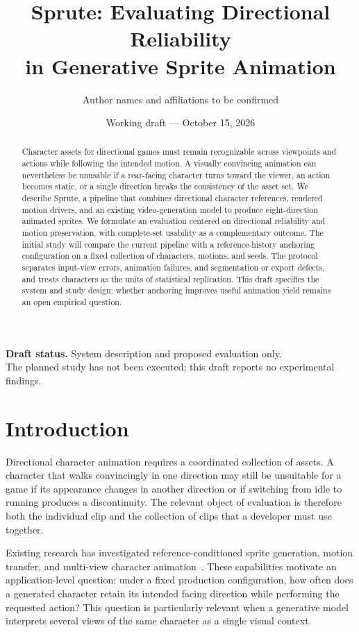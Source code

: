 \documentclass[11pt]{article}
\title{Sprute: Evaluating Directional Reliability\\in Generative Sprite Animation}
\author{Author names and affiliations to be confirmed}
\date{Working draft --- October 15, 2026}
\begin{document}
\maketitle
\begin{center}
\small\textbf{Draft status.} System description and proposed evaluation only.\\
The planned study has not been executed; this draft reports no experimental findings.
\end{center}

\begin{abstract}
Character assets for directional games must remain recognizable across viewpoints and actions while following the intended motion. A visually convincing animation can nevertheless be unusable if a rear-facing character turns toward the viewer, an action becomes static, or a single direction breaks the consistency of the asset set. We describe Sprute, a pipeline that combines directional character references, rendered motion drivers, and an existing video-generation model to produce eight-direction animated sprites. We formulate an evaluation centered on directional reliability and motion preservation, with complete-set usability as a complementary outcome. The initial study will compare the current pipeline with a reference-history anchoring configuration on a fixed collection of characters, motions, and seeds. The protocol separates input-view errors, animation failures, and segmentation or export defects, and treats characters as the units of statistical replication. This draft specifies the system and study design; whether anchoring improves useful animation yield remains an open empirical question.
\end{abstract}

\section{Introduction}
Directional character animation requires a coordinated collection of assets. A character that walks convincingly in one direction may still be unsuitable for a game if its appearance changes in another direction or if switching from idle to running produces a discontinuity. The relevant object of evaluation is therefore both the individual clip and the collection of clips that a developer must use together.

Existing research has investigated reference-conditioned sprite generation, motion transfer, and multi-view character animation~\cite{spritesheet,mvanimate,scail2}. These capabilities motivate an application-level question: under a fixed production configuration, how often does a generated character retain its intended facing direction while performing the requested action? This question is particularly relevant when a generative model interprets several views of the same character as a single visual context.
\end{document}
